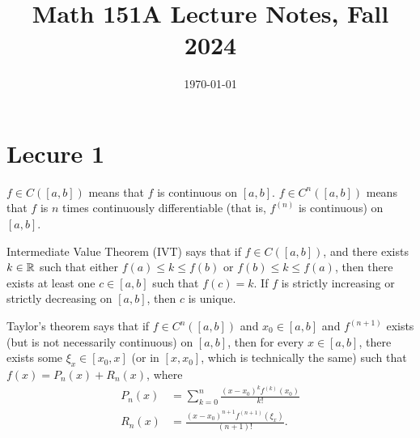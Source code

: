\documentclass{article}
\date{\today}
\title{Math 151A Lecture Notes, Fall 2024}
\begin{document}
\maketitle

\tableofcontents

\section{Lecure 1}
$f \in C([a, b])$ means that $f$ is continuous on $[a,b]$. $f \in C^n([a,b])$ means that $f$ is $n$ times continuously differentiable (that is, $f^{(n)}$ is continuous) on $[a, b]$.
\par
Intermediate Value Theorem (IVT) says that if $f \in C([a,b])$, and there exists $k \in \mathbb{R}$ such that either $f(a) \leq k \leq f(b)$ or $f(b) \leq k \leq f(a)$, then there exists at least one $c \in [a,b]$ such that $f(c)=k$. If $f$ is strictly increasing or strictly decreasing on $[a,b]$, then $c$ is unique.
\par
Taylor's theorem says that if $f \in C^n([a,b])$ and $x_0 \in [a,b]$ and $f^{(n+1)}$ exists (but is not necessarily continuous) on $[a,b]$, then for every $x \in [a,b]$, there exists some $\xi_x \in [x_0, x]$ (or in $[x, x_0]$, which is technically the same) such that $f(x) = P_n(x) + R_n(x)$, where
\begin{align*}
    P_n(x) &= \sum_{k=0}^n \frac{(x-x_0)^k f^{(k)}(x_0)}{k!} \\
    R_n(x) &= \frac{(x-x_0)^{n+1}f^{(n+1)}(\xi_x)}{(n+1)!}.
\end{align*}
\end{document}
